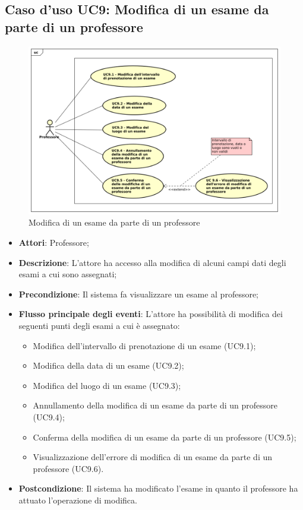 \subsection{Caso d'uso \texorpdfstring{UC9}{UC9}: Modifica di un esame da parte di un professore}
\begin{figure} [H]
	\centering
	\includegraphics[scale=0.45]{./img/UC9.pdf}
	\caption{Modifica di un esame da parte di un professore}\label{}
\end{figure}
\begin{itemize}
	\item \textbf{Attori}: Professore;
	\item \textbf{Descrizione}: L'attore ha accesso alla modifica di alcuni campi dati degli esami a cui sono assegnati;
	\item \textbf{Precondizione}: Il sistema fa visualizzare un esame al professore;
	
	\item \textbf{Flusso principale degli eventi}: L'attore ha possibilità di modifica dei seguenti punti degli esami a cui è assegnato:
	\begin{itemize}
		\item Modifica dell'intervallo di prenotazione di un esame (UC9.1);
		\item Modifica della data di un esame (UC9.2);
		\item Modifica del luogo di un esame (UC9.3);
		\item Annullamento della modifica di un esame da parte di un professore (UC9.4);
		\item Conferma della modifica di un esame da parte di un professore (UC9.5);
		\item Visualizzazione dell'errore di modifica di un esame da parte di un professore (UC9.6).
	\end{itemize}
	\item \textbf{Postcondizione}: Il sistema ha modificato l'esame in quanto il professore ha attuato l'operazione di modifica.
	
\end{itemize}
